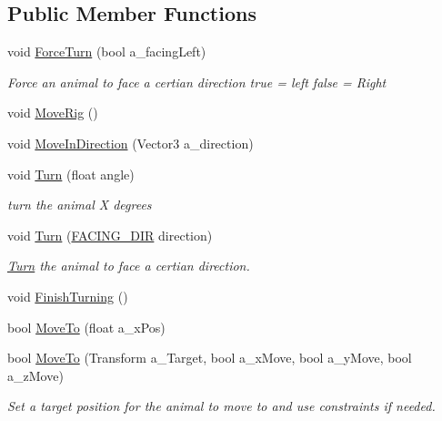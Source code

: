 \subsection*{Public Member Functions}
\begin{DoxyCompactItemize}
\item 
void \mbox{\hyperlink{class_animal_adb0b40e67dde94df8dc45f9e8334b493}{Force\+Turn}} (bool a\+\_\+facing\+Left)
\begin{DoxyCompactList}\small\item\em Force an animal to face a certian direction true = left false = Right \end{DoxyCompactList}\item 
void \mbox{\hyperlink{class_animal_a3eddbb966da9cfcd7cd08f96157c01f9}{Move\+Rig}} ()
\item 
void \mbox{\hyperlink{class_animal_ab06d0e969d8991b816f024e156608cb5}{Move\+In\+Direction}} (Vector3 a\+\_\+direction)
\item 
void \mbox{\hyperlink{class_animal_a676f9175b4ab6957d904e9bb62fdb3b4}{Turn}} (float angle)
\begin{DoxyCompactList}\small\item\em turn the animal X degrees \end{DoxyCompactList}\item 
void \mbox{\hyperlink{class_animal_a9bd4c172143d8daa1f6b3ad12d6a67c2}{Turn}} (\mbox{\hyperlink{_animal_8cs_a57d10208ebba781ae206546ada2002b6}{F\+A\+C\+I\+N\+G\+\_\+\+D\+IR}} direction)
\begin{DoxyCompactList}\small\item\em \mbox{\hyperlink{class_turn}{Turn}} the animal to face a certian direction. \end{DoxyCompactList}\item 
void \mbox{\hyperlink{class_animal_ad6e340c5c3ce2f8b2a6a94cb7bc076f3}{Finish\+Turning}} ()
\item 
bool \mbox{\hyperlink{class_animal_a06e28a266cca3c46759ea1094630410f}{Move\+To}} (float a\+\_\+x\+Pos)
\item 
bool \mbox{\hyperlink{class_animal_a567f0a18ff56a69e2d6531c8edec83d2}{Move\+To}} (Transform a\+\_\+\+Target, bool a\+\_\+x\+Move, bool a\+\_\+y\+Move, bool a\+\_\+z\+Move)
\begin{DoxyCompactList}\small\item\em Set a target position for the animal to move to and use constraints if needed. \end{DoxyCompactList}\item 

\end{DoxyCompactItemize}
